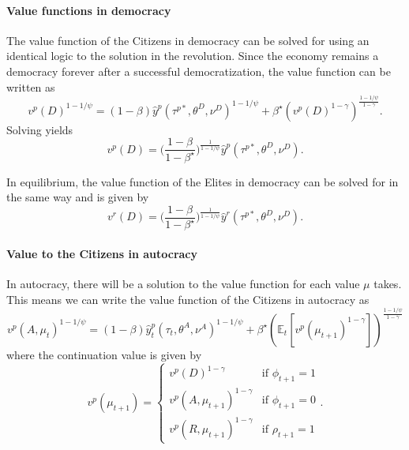 \paragraph{Value functions in democracy}
The value function of the Citizens in democracy can be solved for using an identical logic to the solution in the revolution. Since the economy remains a democracy forever after a successful democratization, the value function can be written as
\begin{equation*}
v^{p}(D)^{1-1/\psi}=(1-\beta)\hat{y}^{p} (\tau^{p*},\theta^{D},\nu^D)^{1-1/\psi}+\beta^{\star}\left(v^{p}(D)^{1-\gamma}\right)^{\frac{1-1/\psi}{1-\gamma}}.
\end{equation*}
Solving yields
\begin{equation*}
v^{p}(D)=\bigg(\frac{1-\beta}{1-\beta^{\star}}\bigg)^{\frac{1}{1-1/\psi}}\hat{y}^{p} (\tau^{p*},\theta^{D},\nu^D).
\end{equation*}

In equilibrium, the value function of the Elites in democracy can be solved for in the same way and is given by
\begin{equation*}
v^{r}(D)=\bigg(\frac{1-\beta}{1-\beta^{\star}}\bigg)^{\frac{1}{1-1/\psi}}\hat{y}^{r} (\tau^{p*},\theta^{D},\nu^D).
\end{equation*}


\paragraph{Value to the Citizens in autocracy}
In autocracy, there will be a solution to the value function for each value $\mu$ takes.  This means we can write the value function of the Citizens in autocracy as
\begin{equation}
	v^{p}(A,\mu_{t})^{1-1/\psi}=(1-\beta)\hat{y}_{t}^{p}(\tau_{t},\theta^{A},\nu^A)^{1-1/\psi}+\beta^{\star}\left(\mathbb{E}_{t}\left[v^p(\mu_{t+1})^{1-\gamma}\right]\right)^{\frac{1-1/\psi}{1-\gamma}}
\end{equation}
where the continuation value is given by
\begin{equation*}
		v^p(\mu_{t+1})=\begin{cases}
v^{p}(D)^{1-\gamma} & \text{if } \phi_{t+1} = 1 \\
v^{p}(A,\mu_{t+1})^{1-\gamma} & \text{if }\phi_{t+1} = 0 \\
v^{p}(R,\mu_{t+1})^{1-\gamma} & \text{if }\rho_{t+1} = 1
\end{cases}.
\end{equation*}

